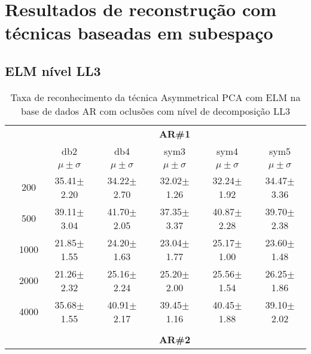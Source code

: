 \section{Resultados de reconstrução com técnicas baseadas em subespaço}



\subsection{ELM nível LL3}



\begin{table}[H]
	\centering
    \normalsize
	\caption{Taxa de reconhecimento da técnica Asymmetrical PCA com ELM na base de dados AR com oclusões com nível de decomposição LL3}
	\begin{tabular}{|c|c|c c c c c|}
\cline{3-7}
\multicolumn{2}{c|}{\multirow{3}{*}{}} & \multicolumn{5}{c|}{\textbf{AR\#1}}   \\\cline{3-7} 
\multicolumn{2}{c|}{}  & db2 & db4 & sym3 & sym4 & sym5 \\\cline{3-7}%
\multicolumn{2}{c|}{}& $\mu \pm \sigma$ & $\mu \pm \sigma$ & $\mu \pm \sigma$ & $\mu \pm \sigma$ & $\mu \pm \sigma$ \\\hline


\multicolumn{1}{|c|}{ \multirow{5}{*}{\rotatebox[origin=c]{90}{\textbf{Neurônios}}} }
&200	&35.41$\pm$2.20	&34.22$\pm$2.70	&32.02$\pm$1.26	&32.24$\pm$1.92	&34.47$\pm$3.36	\\\cline{2-7}
&500	&39.11$\pm$3.04	&41.70$\pm$2.05	&37.35$\pm$3.37	&40.87$\pm$2.28	&39.70$\pm$2.38	\\\cline{2-7}
&1000	&21.85$\pm$1.55	&24.20$\pm$1.63	&23.04$\pm$1.77	&25.17$\pm$1.00	&23.60$\pm$1.48	\\\cline{2-7}
&2000	&21.26$\pm$2.32	&25.16$\pm$2.24	&25.20$\pm$2.00	&25.56$\pm$1.54	&26.25$\pm$1.86	\\\cline{2-7}
&4000	&35.68$\pm$1.55	&40.91$\pm$2.17	&39.45$\pm$1.16	&40.45$\pm$1.88	&39.10$\pm$2.02	

\\\midrule%

\multicolumn{7}{c}{}\\ 

\cline{3-7}
\multicolumn{2}{c|}{\multirow{3}{*}{}} & \multicolumn{5}{c|}{\textbf{AR\#2}}   \\\cline{3-7} 


\end{tabular}
\end{table}
